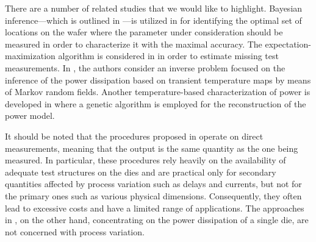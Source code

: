 There are a number of related studies that we would like to highlight. Bayesian
inference---which is outlined in ---is utilized in
\cite{zhang2010} for identifying the optimal set of locations on the wafer where
the parameter under consideration should be measured in order to characterize it
with the maximal accuracy. The expectation-maximization algorithm is considered
in \cite{reda2009} in order to estimate missing test measurements. In
\cite{paek2012}, the authors consider an inverse problem focused on the
inference of the power dissipation based on transient temperature maps by means
of Markov random fields. Another temperature-based characterization of power is
developed in \cite{mesa-martinez2007} where a genetic algorithm is employed for
the reconstruction of the power model.

It should be noted that the procedures proposed in \cite{zhang2010, reda2009}
operate on direct measurements, meaning that the output is the same quantity as
the one being measured. In particular, these procedures rely heavily on the
availability of adequate test structures on the dies and are practical only for
secondary quantities affected by process variation such as delays and currents,
but not for the primary ones such as various physical dimensions. Consequently,
they often lead to excessive costs and have a limited range of applications. The
approaches in \cite{paek2012, mesa-martinez2007}, on the other hand,
concentrating on the power dissipation of a single die, are not concerned with
process variation.
